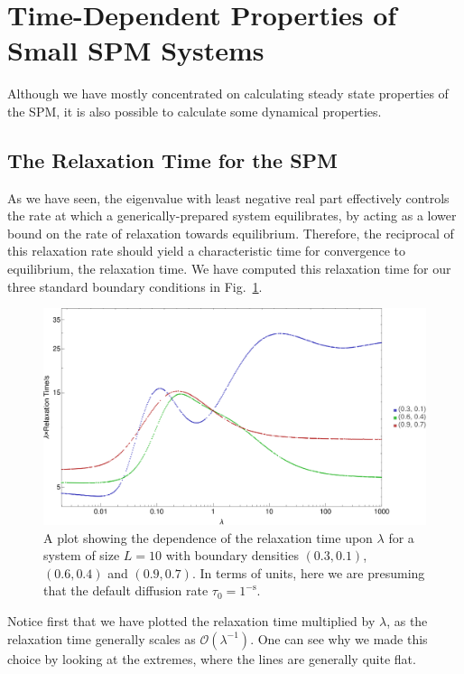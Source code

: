 \section{Time-Dependent Properties of Small SPM Systems}
Although we have mostly concentrated on calculating steady state properties of the SPM, it is also possible to calculate some dynamical properties. 
\subsection{The Relaxation Time for the SPM} \label{sec:relaxTime}
As we have seen, the eigenvalue with least negative real
part effectively controls the rate at which a generically-prepared system equilibrates, by acting as a lower bound on the rate of relaxation towards equilibrium. Therefore, the reciprocal of this 
relaxation rate should yield a characteristic time for convergence to equilibrium, the relaxation
time. We have computed this relaxation time for
our three standard boundary conditions in Fig.~\ref{fig:TRMRelaxTime}.
 \begin{figure}[h!]
 \caption[The dependence of the relaxation time on $\lambda$ for three sets of boundary conditions.]{\label{fig:TRMRelaxTime} 
A plot showing the dependence of the relaxation time upon $\lambda$ for a system of size $L=10$ with
boundary densities $(0.3, 0.1)$, $(0.6, 0.4)$ and $(0.9, 0.7)$. In terms of units, here we are presuming that the default diffusion rate $\tau_0 = 1^{-\mathrm{s}}$.
 }
  \begin{center}
 \includegraphics[width=1.0\textwidth]{TRM/images/TRMRelaxTime}
  \end{center}
\end{figure}
Notice first that we have plotted the relaxation time multiplied by $\lambda$, as the relaxation time
generally scales as $\mathcal{O}(\lambda^{-1})$. One can see why we made this choice by looking at the
extremes, where the lines are generally quite flat.

